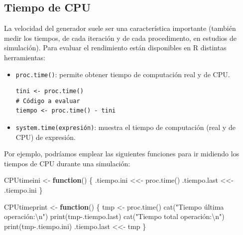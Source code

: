 \documentclass[
]{book}
\newenvironment{Shaded}{\begin{snugshade}}{\end{snugshade}}
\newcommand{\ControlFlowTok}[1]{\textcolor[rgb]{0.13,0.29,0.53}{\textbf{#1}}}
\newcommand{\FunctionTok}[1]{\textcolor[rgb]{0.00,0.00,0.00}{#1}}
\newcommand{\NormalTok}[1]{#1}
\newcommand{\OtherTok}[1]{\textcolor[rgb]{0.56,0.35,0.01}{#1}}
\newcommand{\SpecialCharTok}[1]{\textcolor[rgb]{0.00,0.00,0.00}{#1}}
\newcommand{\StringTok}[1]{\textcolor[rgb]{0.31,0.60,0.02}{#1}}
\theoremstyle{break}
\theoremstyle{nonumberplain}
\begin{document}
\hypertarget{tiempo-de-cpu}{%
\subsection{Tiempo de CPU}\label{tiempo-de-cpu}}

La velocidad del generador suele ser una característica importante (también medir los tiempos, de cada iteración y de cada procedimento, en estudios de simulación).
Para evaluar el rendimiento están disponibles en R distintas herramientas:

\begin{itemize}
\item
  \texttt{proc.time()}: permite obtener tiempo de computación real y de
  CPU.

\begin{verbatim}
tini <- proc.time()
# Código a evaluar
tiempo <- proc.time() - tini
\end{verbatim}
\item
  \texttt{system.time(expresión)}: muestra el tiempo de computación (real y
  de CPU) de expresión.
\end{itemize}

Por ejemplo, podríamos emplear las siguientes funciones para
ir midiendo los tiempos de CPU durante una simulación:

\begin{Shaded}
\begin{Highlighting}[]
\NormalTok{CPUtimeini }\OtherTok{\textless{}{-}} \ControlFlowTok{function}\NormalTok{() \{}
\NormalTok{  .tiempo.ini }\OtherTok{\textless{}\textless{}{-}} \FunctionTok{proc.time}\NormalTok{()}
\NormalTok{  .tiempo.last }\OtherTok{\textless{}\textless{}{-}}\NormalTok{ .tiempo.ini}
\NormalTok{\}}

\NormalTok{CPUtimeprint }\OtherTok{\textless{}{-}} \ControlFlowTok{function}\NormalTok{() \{}
\NormalTok{  tmp }\OtherTok{\textless{}{-}} \FunctionTok{proc.time}\NormalTok{()}
  \FunctionTok{cat}\NormalTok{(}\StringTok{"Tiempo última operación:}\SpecialCharTok{\textbackslash{}n}\StringTok{"}\NormalTok{)}
  \FunctionTok{print}\NormalTok{(tmp}\SpecialCharTok{{-}}\NormalTok{.tiempo.last)}
  \FunctionTok{cat}\NormalTok{(}\StringTok{"Tiempo total operación:}\SpecialCharTok{\textbackslash{}n}\StringTok{"}\NormalTok{)}
  \FunctionTok{print}\NormalTok{(tmp}\SpecialCharTok{{-}}\NormalTok{.tiempo.ini)}
\NormalTok{  .tiempo.last }\OtherTok{\textless{}\textless{}{-}}\NormalTok{ tmp}
\NormalTok{\}}
\end{Highlighting}
\end{Shaded}
\end{document}
